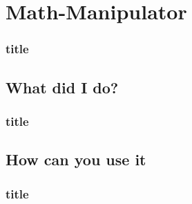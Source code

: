 \section{Math-Manipulator}
    \begin{frame}
        \frametitle{title}
    \end{frame}

    \subsection{What did I do?}
        \begin{frame}
            \frametitle{title}
        \end{frame}

    \subsection{How can you use it}
        \begin{frame}
            \frametitle{title}
        \end{frame}
